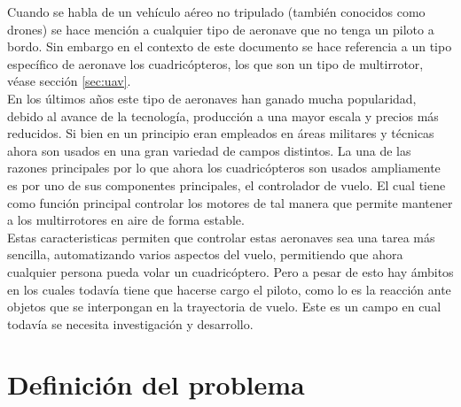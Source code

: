 \documentclass{iccmemoria}
\begin{document}
Cuando se habla de un vehículo aéreo no tripulado (también conocidos como drones) se hace mención a cualquier tipo de aeronave que no tenga un piloto a bordo. Sin embargo en el contexto de este documento se hace referencia a un tipo específico de aeronave los cuadricópteros, los que son un tipo de multirrotor, véase sección \ref{sec:uav}.\\

En los últimos años este tipo de aeronaves han ganado mucha popularidad, debido al avance de la tecnología, producción a una mayor escala y precios más reducidos. Si bien en un principio eran empleados en áreas militares y técnicas ahora son usados en una gran variedad de campos distintos. La una de las razones principales por lo que ahora  los cuadricópteros son usados ampliamente es por uno de sus componentes principales, el controlador de vuelo. El cual tiene como función principal controlar los motores de tal manera que permite mantener a los multirrotores en aire de forma estable.\\

Estas caracteristicas permiten que controlar estas aeronaves sea una tarea más sencilla, automatizando varios aspectos del vuelo, permitiendo que ahora cualquier persona pueda volar un cuadricóptero. Pero a pesar de esto hay ámbitos en los cuales todavía tiene que hacerse cargo el piloto, como lo es la reacción ante objetos que se interpongan en la trayectoria de vuelo. Este es un campo en cual todavía se necesita investigación y desarrollo.\\



\section{Definición del problema}
\end{document}
